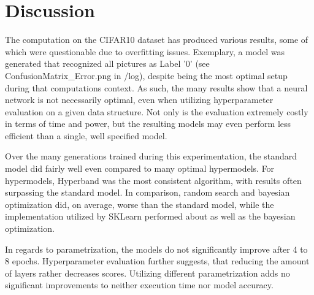 \chapter{Discussion}
The computation on the CIFAR10 dataset has produced various results, some of which were questionable due to overfitting issues. 
Exemplary, a model was generated that recognized all pictures as Label '0' (see ConfusionMatrix\_Error.png in /log), despite being the most optimal setup during that computations context.
As such, the many results show that a neural network is not necessarily optimal, even when utilizing hyperparameter evaluation on a given data structure. 
Not only is the evaluation extremely costly in terms of time and power, but the resulting models may even perform less efficient than a single, well specified model. 

Over the many generations trained during this experimentation, the standard model did fairly well even compared to many optimal hypermodels.
For hypermodels, Hyperband was the most consistent algorithm, with results often surpassing the standard model.
In comparison, random search and bayesian optimization did, on average, worse than the standard model, while the implementation utilized by SKLearn performed about as well as the bayesian optimization.

In regards to parametrization, the models do not significantly improve after 4 to 8 epochs. 
Hyperparameter evaluation further suggests, that reducing the amount of layers rather decreases scores.
Utilizing different parametrization adds no significant improvements to neither execution time nor model accuracy.